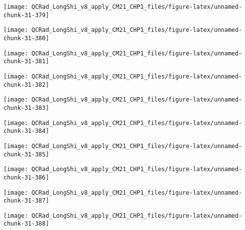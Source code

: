 \documentclass[
  10pt,
  a4paper,oneside]{article}
\begin{document}
\begin{center}\texttt{[image: QCRad\_LongShi\_v8\_apply\_CM21\_CHP1\_files/figure-latex/unnamed-chunk-31-379]} \end{center}

\begin{center}\texttt{[image: QCRad\_LongShi\_v8\_apply\_CM21\_CHP1\_files/figure-latex/unnamed-chunk-31-380]} \end{center}

\begin{center}\texttt{[image: QCRad\_LongShi\_v8\_apply\_CM21\_CHP1\_files/figure-latex/unnamed-chunk-31-381]} \end{center}

\begin{center}\texttt{[image: QCRad\_LongShi\_v8\_apply\_CM21\_CHP1\_files/figure-latex/unnamed-chunk-31-382]} \end{center}

\begin{center}\texttt{[image: QCRad\_LongShi\_v8\_apply\_CM21\_CHP1\_files/figure-latex/unnamed-chunk-31-383]} \end{center}

\begin{center}\texttt{[image: QCRad\_LongShi\_v8\_apply\_CM21\_CHP1\_files/figure-latex/unnamed-chunk-31-384]} \end{center}

\begin{center}\texttt{[image: QCRad\_LongShi\_v8\_apply\_CM21\_CHP1\_files/figure-latex/unnamed-chunk-31-385]} \end{center}

\begin{center}\texttt{[image: QCRad\_LongShi\_v8\_apply\_CM21\_CHP1\_files/figure-latex/unnamed-chunk-31-386]} \end{center}

\begin{center}\texttt{[image: QCRad\_LongShi\_v8\_apply\_CM21\_CHP1\_files/figure-latex/unnamed-chunk-31-387]} \end{center}

\begin{center}\texttt{[image: QCRad\_LongShi\_v8\_apply\_CM21\_CHP1\_files/figure-latex/unnamed-chunk-31-388]} \end{center}
\end{document}
